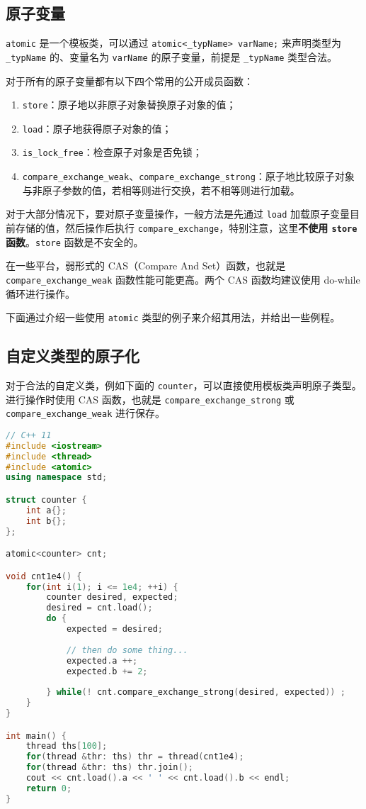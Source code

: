 \subsection{原子变量}
\verb`atomic` 是一个模板类，可以通过 \verb`atomic<_typName> varName;` 来声明类型为 \verb`_typName` 的、变量名为 \verb`varName` 的原子变量，前提是 \verb`_typName` 类型合法。

对于所有的原子变量都有以下四个常用的公开成员函数：
\begin{enumerate}
\item \verb`store`：原子地以非原子对象替换原子对象的值；
\item \verb`load`：原子地获得原子对象的值；
\item \verb`is_lock_free`：检查原子对象是否免锁；
\item \verb`compare_exchange_weak`、\verb`compare_exchange_strong`：原子地比较原子对象与非原子参数的值，若相等则进行交换，若不相等则进行加载。
\end{enumerate}

对于大部分情况下，要对原子变量操作，一般方法是先通过 \verb`load` 加载原子变量目前存储的值，然后操作后执行 \verb`compare_exchange`，特别注意，这里\textbf{不使用 \verb`store` 函数}。\verb`store` 函数是不安全的。

在一些平台，弱形式的 CAS（Compare And Set）函数，也就是 \verb`compare_exchange_weak` 函数性能可能更高。两个 CAS 函数均建议使用 do-while 循环进行操作。

下面通过介绍一些使用 \verb`atomic` 类型的例子来介绍其用法，并给出一些例程。

\subsection{自定义类型的原子化}
对于合法的自定义类，例如下面的 \verb`counter`，可以直接使用模板类声明原子类型。进行操作时使用 CAS 函数，也就是 \verb`compare_exchange_strong` 或 \verb`compare_exchange_weak` 进行保存。

\begin{lstlisting}[language=cpp]
// C++ 11
#include <iostream>
#include <thread>
#include <atomic>
using namespace std;

struct counter {
	int a{};
	int b{};
};

atomic<counter> cnt;

void cnt1e4() {
	for(int i(1); i <= 1e4; ++i) {
		counter desired, expected;
		desired = cnt.load();
		do {
			expected = desired;
			
			// then do some thing...
			expected.a ++;
			expected.b += 2;
			
		} while(! cnt.compare_exchange_strong(desired, expected)) ;
	}
}

int main() {
	thread ths[100];
	for(thread &thr: ths) thr = thread(cnt1e4);
	for(thread &thr: ths) thr.join();
	cout << cnt.load().a << ' ' << cnt.load().b << endl;
	return 0;
}
\end{lstlisting}


